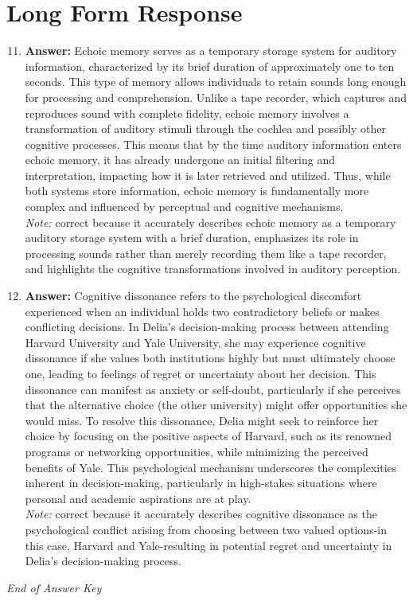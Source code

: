 \documentclass[12pt]{article}
\begin{document}
\section*{Long Form Response}
\begin{enumerate}[label=\arabic*.]
\setcounter{enumi}{10}
\item \textbf{Answer:} Echoic memory serves as a temporary storage system for auditory information, characterized by its brief duration of approximately one to ten seconds. This type of memory allows individuals to retain sounds long enough for processing and comprehension. Unlike a tape recorder, which captures and reproduces sound with complete fidelity, echoic memory involves a transformation of auditory stimuli through the cochlea and possibly other cognitive processes. This means that by the time auditory information enters echoic memory, it has already undergone an initial filtering and interpretation, impacting how it is later retrieved and utilized. Thus, while both systems store information, echoic memory is fundamentally more complex and influenced by perceptual and cognitive mechanisms.
\\ \textit{Note:} correct because it accurately describes echoic memory as a temporary auditory storage system with a brief duration, emphasizes its role in processing sounds rather than merely recording them like a tape recorder, and highlights the cognitive transformations involved in auditory perception.
\item \textbf{Answer:} Cognitive dissonance refers to the psychological discomfort experienced when an individual holds two contradictory beliefs or makes conflicting decisions. In Delia's decision-making process between attending Harvard University and Yale University, she may experience cognitive dissonance if she values both institutions highly but must ultimately choose one, leading to feelings of regret or uncertainty about her decision. This dissonance can manifest as anxiety or self-doubt, particularly if she perceives that the alternative choice (the other university) might offer opportunities she would miss. To resolve this dissonance, Delia might seek to reinforce her choice by focusing on the positive aspects of Harvard, such as its renowned programs or networking opportunities, while minimizing the perceived benefits of Yale. This psychological mechanism underscores the complexities inherent in decision-making, particularly in high-stakes situations where personal and academic aspirations are at play.
\\ \textit{Note:} correct because it accurately describes cognitive dissonance as the psychological conflict arising from choosing between two valued options-in this case, Harvard and Yale-resulting in potential regret and uncertainty in Delia's decision-making process.
\end{enumerate}

\vfill
\noindent\textit{End of Answer Key}
\end{document}
